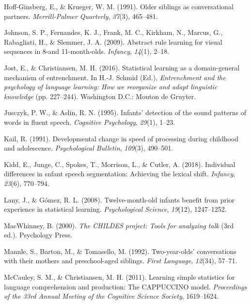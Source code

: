 \documentclass[man,mask,floatsintext]{apa6}
\begin{document}
\hypertarget{ref-hoff1991older}{}
Hoff-Ginsberg, E., \& Krueger, W. M. (1991). Older siblings as
conversational partners. \emph{Merrill-Palmer Quarterly}, \emph{37}(3),
465--481.

\hypertarget{ref-johnson2009abstract}{}
Johnson, S. P., Fernandes, K. J., Frank, M. C., Kirkham, N., Marcus, G.,
Rabagliati, H., \& Slemmer, J. A. (2009). Abstract rule learning for
visual sequences in 8-and 11-month-olds. \emph{Infancy}, \emph{14}(1),
2--18.

\hypertarget{ref-jost201610}{}
Jost, E., \& Christiansen, M. H. (2016). Statistical learning as a
domain-general mechanism of entrenchment. In H.-J. Schmid (Ed.),
\emph{Entrenchment and the psychology of language learning: How we
reorganize and adapt linguistic knowledge} (pp. 227--244). Washington
D.C.: Mouton de Gruyter.

\hypertarget{ref-jusczyk1995infants}{}
Jusczyk, P. W., \& Aslin, R. N. (1995). Infants' detection of the sound
patterns of words in fluent speech. \emph{Cognitive Psychology},
\emph{29}(1), 1--23.

\hypertarget{ref-kail1991developmental}{}
Kail, R. (1991). Developmental change in speed of processing during
childhood and adolescence. \emph{Psychological Bulletin}, \emph{109}(3),
490--501.

\hypertarget{ref-kidd2018individual}{}
Kidd, E., Junge, C., Spokes, T., Morrison, L., \& Cutler, A. (2018).
Individual differences in snfant speech segmentation: Achieving the
lexical shift. \emph{Infancy}, \emph{23}(6), 770--794.

\hypertarget{ref-lany2008twelve}{}
Lany, J., \& Gómez, R. L. (2008). Twelve-month-old infants benefit from
prior experience in statistical learning. \emph{Psychological Science},
\emph{19}(12), 1247--1252.

\hypertarget{ref-childes}{}
MacWhinney, B. (2000). \emph{The CHILDES project: Tools for analyzing
talk} (3rd ed.). Psychology Press.

\hypertarget{ref-mannle1992twoyearolds}{}
Mannle, S., Barton, M., \& Tomasello, M. (1992). Two-year-olds'
conversations with their mothers and preschool-aged siblings.
\emph{First Language}, \emph{12}(34), 57--71.

\hypertarget{ref-mccauley2011learning}{}
McCauley, S. M., \& Christiansen, M. H. (2011). Learning simple
statistics for language comprehension and production: The CAPPUCCINO
model. \emph{Proceedings of the 33rd Annual Meeting of the Cognitive
Science Society}, 1619--1624.
\end{document}
